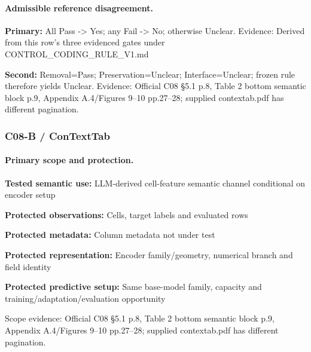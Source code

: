 \documentclass[10pt]{article}
\begin{document}
\paragraph{Admissible reference disagreement.}
\textbf{Primary:} All Pass -> Yes; any Fail -> No; otherwise Unclear. Evidence: Derived from this row’s three evidenced gates under CONTROL\_CODING\_RULE\_V1.md\par
\textbf{Second:} Removal=Pass; Preservation=Unclear; Interface=Unclear; frozen rule therefore yields Unclear. Evidence: Official C08 §5.1 p.8, Table 2 bottom semantic block p.9, Appendix A.4/Figures 9--10 pp.27--28; supplied contextab.pdf has different pagination.\par
\subsubsection*{C08-B / ConTextTab}
\paragraph{Primary scope and protection.}
\textbf{Tested semantic use:} LLM-derived cell-feature semantic channel conditional on encoder setup\par
\textbf{Protected observations:} Cells, target labels and evaluated rows\par
\textbf{Protected metadata:} Column metadata not under test\par
\textbf{Protected representation:} Encoder family/geometry, numerical branch and field identity\par
\textbf{Protected predictive setup:} Same base-model family, capacity and training/adaptation/evaluation opportunity\par
Scope evidence: Official C08 §5.1 p.8, Table 2 bottom semantic block p.9, Appendix A.4/Figures 9--10 pp.27--28; supplied contextab.pdf has different pagination.\par
\end{document}
